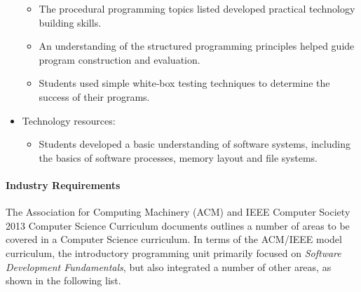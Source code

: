\begin{itemize}[noitemsep,nolistsep]
\begin{itemize}[noitemsep,nolistsep]
		\item The procedural programming topics listed developed practical technology building skills.
		\item An understanding of the structured programming principles helped guide program construction and evaluation.
		\item Students used simple white-box testing techniques to determine the success of their programs.
	\end{itemize}
	\item Technology resources:
	\begin{itemize}[noitemsep,nolistsep]
		\item Students developed a basic understanding of software systems, including the basics of software processes, memory layout and file systems.
	\end{itemize}
\end{itemize}


\paragraph{Industry Requirements} %
\label{par:industry_requirements}

The Association for Computing Machinery (ACM) and IEEE Computer Society 2013 Computer Science Curriculum documents \cite{CSC2013} outlines a number of areas to be covered in a Computer Science curriculum. In terms of the ACM/IEEE model curriculum, the introductory programming unit primarily focused on \emph{Software Development Fundamentals}, but also integrated a number of other areas, as shown in the following list.


